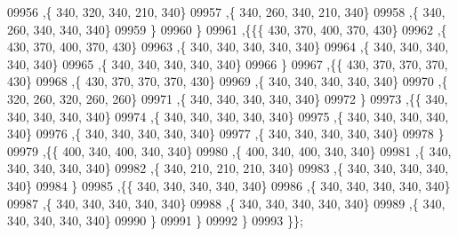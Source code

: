\begin{DoxyCode}
09956     ,\{   340,   320,   340,   210,   340\}
09957     ,\{   340,   260,   340,   210,   340\}
09958     ,\{   340,   260,   340,   340,   340\}
09959     \}
09960    \}
09961   ,\{\{\{   430,   370,   400,   370,   430\}
09962     ,\{   430,   370,   400,   370,   430\}
09963     ,\{   340,   340,   340,   340,   340\}
09964     ,\{   340,   340,   340,   340,   340\}
09965     ,\{   340,   340,   340,   340,   340\}
09966     \}
09967    ,\{\{   430,   370,   370,   370,   430\}
09968     ,\{   430,   370,   370,   370,   430\}
09969     ,\{   340,   340,   340,   340,   340\}
09970     ,\{   320,   260,   320,   260,   260\}
09971     ,\{   340,   340,   340,   340,   340\}
09972     \}
09973    ,\{\{   340,   340,   340,   340,   340\}
09974     ,\{   340,   340,   340,   340,   340\}
09975     ,\{   340,   340,   340,   340,   340\}
09976     ,\{   340,   340,   340,   340,   340\}
09977     ,\{   340,   340,   340,   340,   340\}
09978     \}
09979    ,\{\{   400,   340,   400,   340,   340\}
09980     ,\{   400,   340,   400,   340,   340\}
09981     ,\{   340,   340,   340,   340,   340\}
09982     ,\{   340,   210,   210,   210,   340\}
09983     ,\{   340,   340,   340,   340,   340\}
09984     \}
09985    ,\{\{   340,   340,   340,   340,   340\}
09986     ,\{   340,   340,   340,   340,   340\}
09987     ,\{   340,   340,   340,   340,   340\}
09988     ,\{   340,   340,   340,   340,   340\}
09989     ,\{   340,   340,   340,   340,   340\}
09990     \}
09991    \}
09992   \}
09993  \}\};
\end{DoxyCode}
